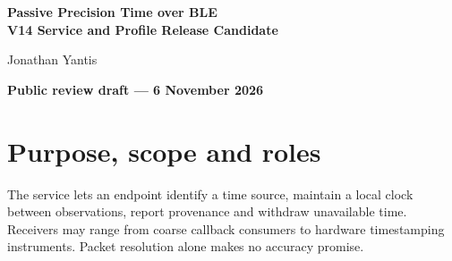 \documentclass[11pt,letterpaper]{article}
\begin{document}
\thispagestyle{plain}
\begin{center}
{\LARGE\bfseries Passive Precision Time over BLE\\V14 Service and Profile Release Candidate\par}
\vspace{8pt}Jonathan Yantis\par
{\small\bfseries Public review draft --- 6 November 2026}
\end{center}
\begin{abstract}
Passive Precision Time over BLE (PToB) transfers shared time to heterogeneous Bluetooth Low Energy receivers. Periodic advertisements identify physical transmissions; later corrections let receivers discipline local clocks without a transaction for each timestamp. This release candidate pins the implemented BLE wire profile: G7V4 grandmaster control, GR3 root and RC7/profile 5 relay timing, JOIN5 and revision 8 relay admission, and coarse civil-time metadata. It defines when a source may serve, when a HOT successor may take over, and when a receiver must withdraw time. Byte compatibility, physical failover, and calibrated output accuracy are separate review gates.
\end{abstract}
\section{Purpose, scope and roles}
The service lets an endpoint identify a time source, maintain a local clock between observations, report provenance and withdraw unavailable time. Receivers may range from coarse callback consumers to hardware timestamping instruments. Packet resolution alone makes no accuracy promise.
\end{document}
